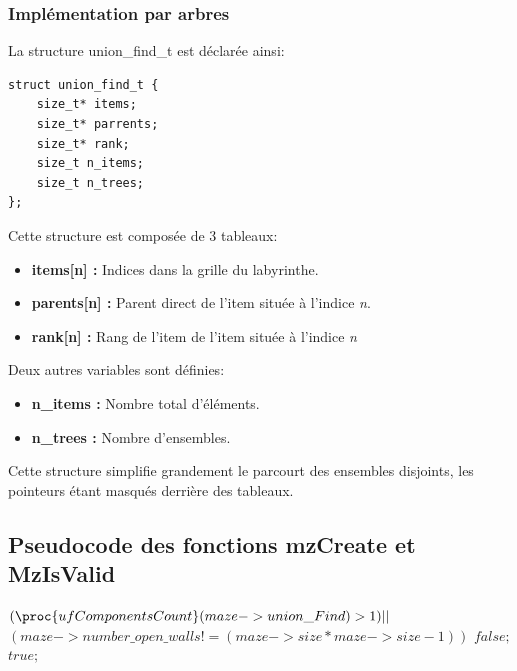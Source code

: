 \documentclass[10pt]{article}
\begin{document}
\subsubsection{Implémentation par arbres}

La structure union\_find\_t est déclarée ainsi:
\begin{lstlisting}[style=CStyle]
struct union_find_t {
    size_t* items;
    size_t* parrents;
    size_t* rank;
    size_t n_items;
    size_t n_trees;
};
\end{lstlisting}
Cette structure est composée de 3 tableaux:
\begin{itemize}
\item \textbf{items[n] :} Indices dans la grille du labyrinthe.
\item \textbf{parents[n] :} Parent direct de l'item située à l'indice \emph{n}.
\item \textbf{rank[n] :} Rang de l'item de l'item située à l'indice \emph{n}
\end{itemize}
Deux autres variables sont définies:
\begin{itemize}
\item \textbf{n\_items :} Nombre total d'éléments.
\item \textbf{n\_trees :} Nombre d'ensembles.
\end{itemize}
 
 Cette structure simplifie grandement le parcourt des ensembles disjoints, les pointeurs étant masqués derrière des tableaux.
 

\subsection{Pseudocode des fonctions mzCreate et MzIsValid}

\begin{codebox}
\li    \If $(\proc{ufComponentsCount}(maze->union\_Find) > 1) || $
\li$(maze->number\_open\_walls != (maze->size * maze->size - 1))$
\li    \Then \Return $false;$
\li    \Else 
\li 		\Return $true;$
\end{codebox}
\end{document}
